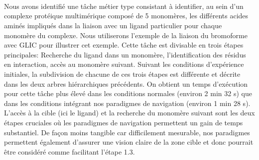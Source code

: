 \\
\\
\\

Nous avons identifié une tâche métier type consistant à identifier, au sein d'un complexe protéique multimérique composé de 5 monomères, les différents acides aminés impliqués dans la liaison avec un ligand particulier pour chaque monomère du complexe. Nous utiliserons l'exemple de la liaison du bromoforme avec GLIC pour illustrer cet exemple. Cette tâche est divisable en trois étapes principales: Recherche du ligand dans un monomère, l'identification des résidus en interaction, accès au monomère suivant. Suivant les conditions d'expérience initiales, la subdivision de chacune de ces trois étapes est différente et décrite dans les deux arbres hiérarchiques précédents. On obtient un temps d’exécution pour cette tâche plus élevé dans les conditions normales (environ 2 min 32 s) que dans les conditions intégrant nos paradigmes de navigation (environ 1 min 28 s). L'accès à la cible (ici le ligand) et la recherche du monomère suivant sont les deux étapes cruciales où les paradigmes de navigation permettent un gain de temps substantiel. De façon moins tangible car difficilement mesurable, nos paradigmes permettent également d'assurer une vision claire de la zone cible et donc pourrait être considéré comme facilitant l'étape 1.3.

